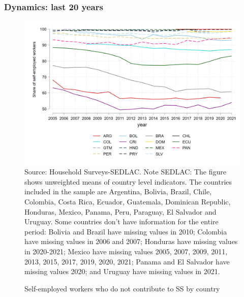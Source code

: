 \documentclass{beamer}
\begin{document}
\begin{frame}
\frametitle{Dynamics: last 20 years}
\begin{figure}[!htb]
        \justifying
        \caption{Self-employed workers who do not contribute to SS by country}     
        \includegraphics[scale=.2]{latex/figures/Evolution/iss_sfemployed_all.png}
        \label{fig:Evolution_selfemployedSS}
        \footnotesize{Source: Household Surveys-SEDLAC.}
       \footnotesize{Note SEDLAC: The figure shows unweighted means of country level indicators. The countries included in the sample are Argentina, Bolivia, Brazil, Chile, Colombia, Costa Rica, Ecuador, Guatemala, Dominican Republic, Honduras, Mexico, Panama, Peru, Paraguay, El Salvador and Uruguay. Some countries don’t have information for the entire period: Bolivia and Brazil have missing values in 2010; Colombia have missing values in 2006 and 2007; Honduras have missing values in 2020-2021; Mexico have missing values 2005, 2007, 2009, 2011, 2013, 2015, 2017, 2019, 2020, 2021; Panama and El Salvador have missing values 2020; and Uruguay have missing values in 2021.}
 \end{figure}
 \end{frame}
\end{document}
